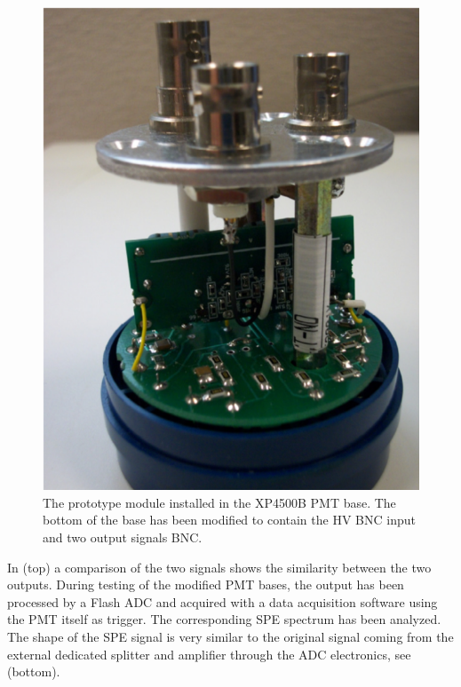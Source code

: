 \begin{figure}
	\centering
	\includegraphics[width=0.95\columnwidth,keepaspectratio]{img/pmtWithDivider.png}
	\caption{The prototype module installed in the XP4500B PMT base. The bottom of the base has been modified to contain the HV
				BNC input and two output signals BNC. }
	\label{fig:pmtWithDivider}
\end{figure}

In  (top) a comparison of the two signals shows the similarity between the two outputs.
During testing of the modified PMT bases, the output has been processed by a Flash ADC and acquired with a data
acquisition software using the PMT itself as trigger.
The corresponding SPE spectrum has been analyzed. The shape of the SPE signal is very similar to the original signal
coming from the external dedicated splitter and amplifier through the ADC electronics, see   (bottom).

